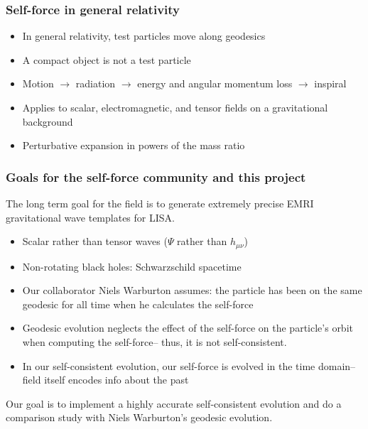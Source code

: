 \documentclass{beamer}
\begin{document}
\begin{frame}
  \frametitle{Self-force in general relativity}
  \begin{itemize}
  \item In general relativity, test particles move along geodesics
  \item A compact object is not a test particle
  \item Motion $\rightarrow$ radiation $\rightarrow$ energy and angular momentum loss $\rightarrow$ inspiral
  \item Applies to scalar, electromagnetic, and tensor fields on a gravitational background
  \item Perturbative expansion in powers of the mass ratio
  \end{itemize}
\end{frame}

\begin{frame}
  \frametitle{Goals for the self-force community and this project}
  The long term goal for the field is to generate extremely precise EMRI gravitational wave templates for LISA.

  \begin{itemize}
  \item Scalar rather than tensor waves ($\Psi$ rather than $h_{\mu\nu}$)
  \item Non-rotating black holes: Schwarzschild spacetime
  \item Our collaborator Niels Warburton assumes: the particle has been on the same geodesic for all time when he calculates the self-force
  \item Geodesic evolution neglects the effect of the self-force on the particle's orbit when computing the self-force-- thus, it is not self-consistent.
  \item In our self-consistent evolution, our self-force is evolved in the time domain-- field itself encodes info about the past
  \end{itemize}
  
  Our goal is to implement a highly accurate self-consistent evolution and do a comparison study with Niels Warburton's geodesic evolution.
  
\end{frame}
\end{document}
